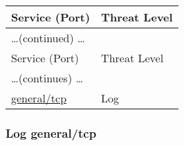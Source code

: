 \documentclass{article}
\begin{document}
\begin{longtable}{|l|l|}
\hline
\rowcolor{gvm_report}Service (Port)&Threat Level\\
\hline
\endfirsthead
\multicolumn{2}{l}{\hfill\ldots (continued) \ldots}\\
\hline
\rowcolor{gvm_report}Service (Port)&Threat Level\\
\hline
\endhead
\hline
\multicolumn{2}{l}{\ldots (continues) \ldots}\\
\endfoot
\hline
\endlastfoot
\hline
\hyperref[port:192.168.178.41 general/tcp Log]{general/tcp}&Log\\
\hline
\end{longtable}



\subsubsection{Log general/tcp}
\label{port:192.168.178.41 general/tcp Log}
\end{document}
